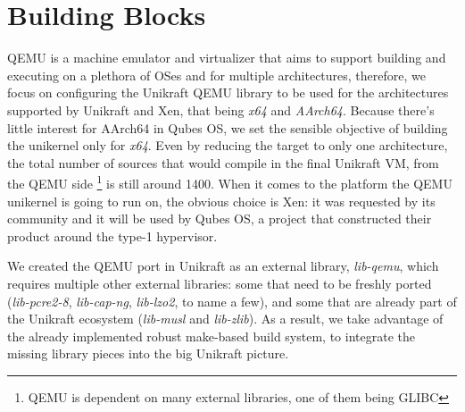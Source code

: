 \chapter{Building Blocks}
\label{chapter:building-blocks}

QEMU \cite{qemu} is a machine emulator and virtualizer that aims to support building and executing on a plethora of OSes and for multiple architectures, therefore, we focus on configuring the Unikraft QEMU library to be used for the architectures supported by Unikraft and Xen, that being \textit{x64} and \textit{AArch64}.
Because there's little interest for AArch64 in Qubes OS, we set the sensible objective of building the unikernel only for \textit{x64}.
Even by reducing the target to only one architecture, the total number of sources that would compile in the final Unikraft VM, from the QEMU side \footnote{QEMU is dependent on many external libraries, one of them being GLIBC} is still around 1400.
When it comes to the platform the QEMU unikernel is going to run on, the obvious choice is Xen: it was requested by its community and it will be used by Qubes OS, a project that constructed their product around the type-1 hypervisor.

We created the QEMU port in Unikraft as an external library, \textit{lib-qemu}, which requires multiple other external libraries: some that need to be freshly ported (\textit{lib-pcre2-8}, \textit{lib-cap-ng}, \textit{lib-lzo2}, to name a few), and some that are already part of the Unikraft ecosystem (\textit{lib-musl} and \textit{lib-zlib}).
As a result, we take advantage of the already implemented robust make-based build system, to integrate the missing library pieces into the big Unikraft picture.
